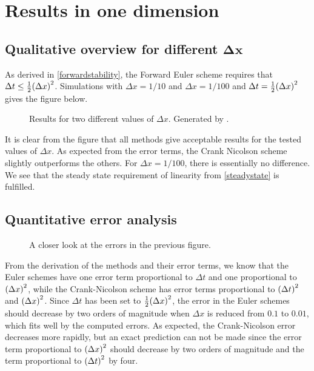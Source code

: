 %
\section{Results in one dimension}
\subsection{Qualitative overview for different \(\boldsymbol{\Delta x}\)}
As derived in \ref{forwardstability}, the Forward Euler scheme requires that \(\Delta t \leq \tfrac{1}{2}\qty(\Delta x)^2\). Simulations with \(\Delta x = 1/10\) and \(\Delta x = 1/100\) and \(\Delta t = \tfrac{1}{2}\qty(\Delta x)^2\) gives the figure below.
\begin{figure}[H]
\centering

\caption{Results for two different values of \(\Delta x\). Generated by .}
\end{figure}
It is clear from the figure that all methods give acceptable results for the tested values of \(\Delta x\). As expected from the error terms, the Crank Nicolson scheme slightly outperforms the others. For \(\Delta x=1/100\), there is essentially no difference. We see that the steady state requirement of linearity from \ref{steadystate} is fulfilled.

\subsection{Quantitative error analysis}
\begin{figure}[H]
\centering

\caption{A closer look at the errors in the previous figure.}
\end{figure}
From the derivation of the methods and their error terms, we know that the Euler schemes have one error term proportional to \(\Delta t\) and one proportional to \(\qty(\Delta x)^2\), while the Crank-Nicolson scheme has error terms proportional to \(\qty(\Delta t)^2\) and \(\qty(\Delta x)^2\). Since \(\Delta t\) has been set to \(\tfrac{1}{2}\qty(\Delta x)^2\), the error in the Euler schemes should decrease by two orders of magnitude when \(\Delta x\) is reduced from \(\num{0.1}\) to \(\num{0.01}\), which fits well by the computed errors. As expected, the Crank-Nicolson error decreases more rapidly, but an exact prediction can not be made since the error term proportional to \(\qty(\Delta x)^2\) should decrease by two orders of magnitude and the term proportional to \(\qty(\Delta t)^2\) by four.


